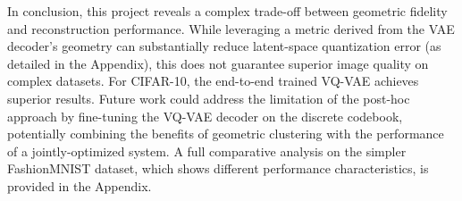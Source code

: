 \documentclass{article}
\begin{document}
In conclusion, this project reveals a complex trade-off between geometric fidelity and reconstruction performance. While leveraging a metric derived from the VAE decoder's geometry can substantially reduce latent-space quantization error (as detailed in the Appendix), this does not guarantee superior image quality on complex datasets. For CIFAR-10, the end-to-end trained VQ-VAE achieves superior results. Future work could address the limitation of the post-hoc approach by fine-tuning the VQ-VAE decoder on the discrete codebook, potentially combining the benefits of geometric clustering with the performance of a jointly-optimized system. A full comparative analysis on the simpler FashionMNIST dataset, which shows different performance characteristics, is provided in the Appendix.



\end{document}
